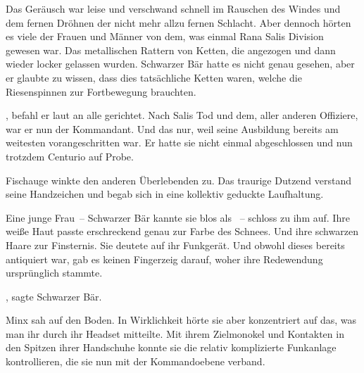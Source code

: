 Das Geräusch war leise und verschwand schnell im Rauschen des Windes und dem fernen Dröhnen der nicht mehr allzu fernen Schlacht. Aber dennoch hörten es viele der Frauen und Männer von dem, was einmal Rana Salis Division gewesen war. Das metallischen Rattern von Ketten, die angezogen und dann wieder locker gelassen wurden. Schwarzer Bär hatte es nicht genau gesehen, aber er glaubte zu wissen, dass dies tatsächliche Ketten waren, welche die Riesenspinnen zur Fortbewegung brauchten.

\par

, befahl er laut an alle gerichtet. Nach Salis Tod und dem, aller anderen Offiziere, war er nun der Kommandant. Und das nur, weil seine Ausbildung bereits am weitesten vorangeschritten war. Er hatte sie nicht einmal abgeschlossen und nun trotzdem Centurio auf Probe.

\par

Fischauge winkte den anderen Überlebenden zu. Das traurige Dutzend verstand seine Handzeichen und begab sich in eine kollektiv geduckte Laufhaltung.

\par

Eine junge Frau~-- Schwarzer Bär kannte sie blos als ~-- schloss zu ihm auf. Ihre weiße Haut passte erschreckend genau zur Farbe des Schnees. Und ihre schwarzen Haare zur Finsternis.  Sie deutete auf ihr Funkgerät. Und obwohl dieses bereits antiquiert war, gab es keinen Fingerzeig darauf, woher ihre Redewendung ursprünglich stammte. 

\par

, sagte Schwarzer Bär. 

\par

Minx sah auf den Boden. In Wirklichkeit hörte sie aber konzentriert auf das, was man ihr durch ihr Headset mitteilte. Mit ihrem Zielmonokel und Kontakten in den Spitzen ihrer Handschuhe konnte sie die relativ komplizierte Funkanlage kontrollieren, die sie nun mit der Kommandoebene verband.


